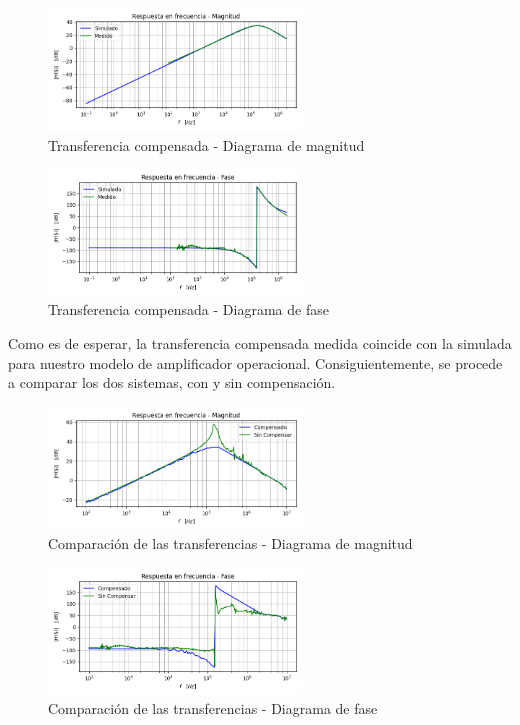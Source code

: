 \begin{figure}[H]
    \centering
    \includegraphics[width=0.6\textwidth]{../Ejercicio3-CircuitoIntegradoresyDerivadores/Imagenes/Derivador/trans_compensa_mag.png}
    \caption{Transferencia compensada - Diagrama de magnitud}

\end{figure}\begin{figure}[H]
    \centering
    \includegraphics[width=0.6\textwidth]{../Ejercicio3-CircuitoIntegradoresyDerivadores/Imagenes/Derivador/trans_compensa_pha.png}
    \caption{Transferencia compensada - Diagrama de fase}

\end{figure}
Como es de esperar, la transferencia compensada medida coincide con la simulada para nuestro modelo de amplificador 
operacional. Consiguientemente, se procede a comparar los dos sistemas, con y sin compensación.
\begin{figure}[H]
    \centering
    \includegraphics[width=0.6\textwidth]{../Ejercicio3-CircuitoIntegradoresyDerivadores/Imagenes/Derivador/trans_compensa__comp_mag.png}
    \caption{Comparación de las transferencias - Diagrama de magnitud}

\end{figure}\begin{figure}[H]
    \centering
    \includegraphics[width=0.6\textwidth]{../Ejercicio3-CircuitoIntegradoresyDerivadores/Imagenes/Derivador/trans_compensa__comp_pha.png}
    \caption{Comparación de las transferencias - Diagrama de fase}

\end{figure}
